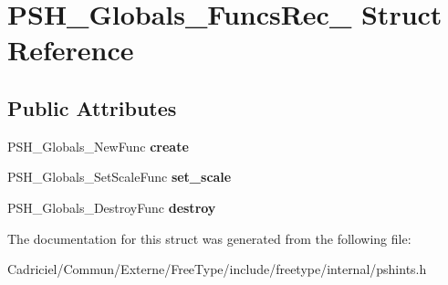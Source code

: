 \hypertarget{struct_p_s_h___globals___funcs_rec__}{}\section{P\+S\+H\+\_\+\+Globals\+\_\+\+Funcs\+Rec\+\_\+ Struct Reference}
\label{struct_p_s_h___globals___funcs_rec__}
\subsection*{Public Attributes}
\begin{DoxyCompactItemize}
\item 
P\+S\+H\+\_\+\+Globals\+\_\+\+New\+Func {\bfseries create}\hypertarget{struct_p_s_h___globals___funcs_rec___ac136cec55ea33a2e3b60ffdad20f5420}{}\label{struct_p_s_h___globals___funcs_rec___ac136cec55ea33a2e3b60ffdad20f5420}

\item 
P\+S\+H\+\_\+\+Globals\+\_\+\+Set\+Scale\+Func {\bfseries set\+\_\+scale}\hypertarget{struct_p_s_h___globals___funcs_rec___a9c97456d3f521cb1091f08c2bda27332}{}\label{struct_p_s_h___globals___funcs_rec___a9c97456d3f521cb1091f08c2bda27332}

\item 
P\+S\+H\+\_\+\+Globals\+\_\+\+Destroy\+Func {\bfseries destroy}\hypertarget{struct_p_s_h___globals___funcs_rec___aebb5534f8305a189b09adfebff4f57ba}{}\label{struct_p_s_h___globals___funcs_rec___aebb5534f8305a189b09adfebff4f57ba}

\end{DoxyCompactItemize}


The documentation for this struct was generated from the following file\+:\begin{DoxyCompactItemize}
\item 
Cadriciel/\+Commun/\+Externe/\+Free\+Type/include/freetype/internal/pshints.\+h\end{DoxyCompactItemize}
